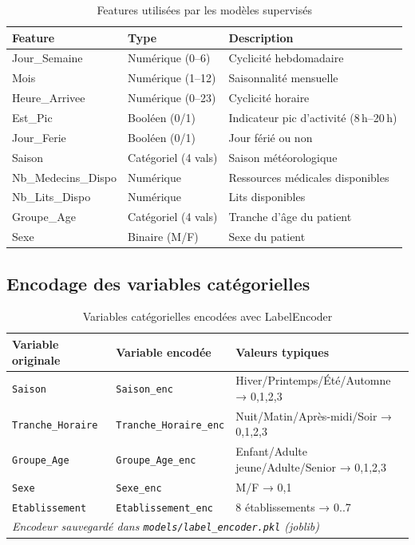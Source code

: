 \documentclass[12pt,a4paper]{report}
\begin{document}
	\begin{table}[H]
		\centering
		\caption{Features utilisées par les modèles supervisés}
		\renewcommand{\arraystretch}{1.2}
		\begin{tabular}{lll}
			\toprule
			\textbf{Feature} & \textbf{Type} & \textbf{Description} \\
			\midrule
			Jour\_Semaine       & Numérique (0--6) & Cyclicité hebdomadaire \\
			Mois                & Numérique (1--12) & Saisonnalité mensuelle \\
			Heure\_Arrivee      & Numérique (0--23) & Cyclicité horaire \\
			Est\_Pic            & Booléen (0/1) & Indicateur pic d'activité (8\,h--20\,h) \\
			Jour\_Ferie         & Booléen (0/1) & Jour férié ou non \\
			Saison              & Catégoriel (4 vals) & Saison météorologique \\
			Nb\_Medecins\_Dispo & Numérique & Ressources médicales disponibles \\
			Nb\_Lits\_Dispo     & Numérique & Lits disponibles \\
			Groupe\_Age         & Catégoriel (4 vals) & Tranche d'âge du patient \\
			Sexe                & Binaire (M/F) & Sexe du patient \\
			\bottomrule
		\end{tabular}
	\end{table}
	
	\subsection{Encodage des variables catégorielles}
	
	\begin{table}[H]
		\centering
		\caption{Variables catégorielles encodées avec LabelEncoder}
		\renewcommand{\arraystretch}{1.3}
		\begin{tabular}{lll}
			\toprule
			\textbf{Variable originale} & \textbf{Variable encodée} & \textbf{Valeurs typiques} \\
			\midrule
			\texttt{Saison}         & \texttt{Saison\_enc}         & Hiver/Printemps/Été/Automne → 0,1,2,3 \\
			\texttt{Tranche\_Horaire} & \texttt{Tranche\_Horaire\_enc} & Nuit/Matin/Après-midi/Soir → 0,1,2,3 \\
			\texttt{Groupe\_Age}    & \texttt{Groupe\_Age\_enc}    & Enfant/Adulte jeune/Adulte/Senior → 0,1,2,3 \\
			\texttt{Sexe}           & \texttt{Sexe\_enc}           & M/F → 0,1 \\
			\texttt{Etablissement}  & \texttt{Etablissement\_enc}  & 8 établissements → 0..7 \\
			\midrule
			\multicolumn{3}{l}{\textit{Encodeur sauvegardé dans \texttt{models/label\_encoder.pkl} (joblib)}} \\
			\bottomrule
		\end{tabular}
	\end{table}
	
\end{document}

